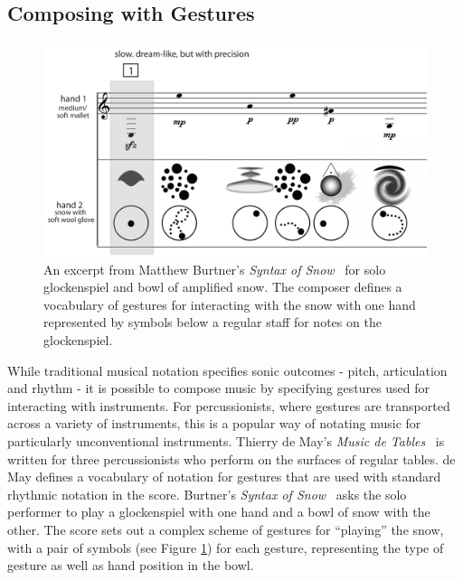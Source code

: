 \documentclass[graybox]{svmult}
\begin{document}
\subsection{Composing with Gestures}
\label{subsec:composing-gestures}

\begin{figure}
\begin{center}
\includegraphics[width=0.7\columnwidth]{figures/syntaxofsnow-excerpt-bw}
\end{center}
\caption{An excerpt from Matthew Burtner's \emph{Syntax of
    Snow}~\cite{Burtner:2011fk} for solo glockenspiel and bowl of
  amplified snow. The composer defines a vocabulary of
  gestures for interacting with the snow with one hand represented by
  symbols below a regular staff for notes on the glockenspiel.}
\label{fig:SyntaxOfSnow}
\end{figure}

While traditional musical notation specifies sonic outcomes - pitch,
articulation and rhythm - it is possible to compose music by
specifying gestures used for interacting with instruments. For
percussionists, where gestures are transported across a variety of
instruments, this is a popular way of notating music for particularly
unconventional instruments. Thierry de May's \emph{Music
de Tables}~\cite{May:1987fk} is written for three percussionists who
perform on the surfaces of regular tables. de May defines a vocabulary
of notation for gestures that are used with standard rhythmic notation
in the score. Burtner's \emph{Syntax of Snow}~\cite{Burtner:2011fk}
asks the solo performer to play a glockenspiel with one hand and a
bowl of snow with the other. The score sets out a complex scheme of
gestures for ``playing'' the snow, with a pair of symbols (see Figure
\ref{fig:SyntaxOfSnow}) for each gesture, representing the type of
gesture as well as hand position in the bowl. 
\end{document}
